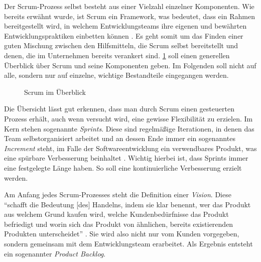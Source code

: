 Der Scrum-Prozess selbst besteht aus einer Vielzahl einzelner Komponenten. Wie bereits erwähnt wurde, ist Scrum ein Framework, was bedeutet, dass ein Rahmen bereitgestellt wird, in welchem Entwicklungsteams ihre eigenen und bewährten Entwicklungspraktiken einbetten können \cite[S. 27]{wirdemann_scrum_2017}. Es geht somit um das Finden einer guten Mischung zwischen den Hilfsmitteln, die Scrum selbst bereitstellt und denen, die im Unternehmen bereits verankert sind. \ref{fig:scrum} soll einen generellen Überblick über Scrum und seine Komponenten geben. Im Folgenden soll nicht auf alle, sondern nur auf einzelne, wichtige Bestandteile eingegangen werden.

\begin{figure}[H]
	\centering
	\caption[Scrum im Überblick]{Scrum im Überblick \protect \cite[S. 29]{wirdemann_scrum_2017}}
	\label{fig:scrum}
\end{figure}

Die Übersicht lässt gut erkennen, dass man durch Scrum  einen gesteuerten Prozess erhält, auch wenn versucht wird, eine gewisse  Flexibilität zu erzielen. Im Kern stehen sogenannte \textit{Sprints}. Diese sind regelmäßige Iterationen, in denen das Team selbstorganisiert arbeitet und an dessen Ende immer ein sogenanntes \textit{Increment} steht, im Falle der Softwareentwicklung ein verwendbares Produkt, was eine spürbare  Verbesserung beinhaltet \cite[S. 30]{wirdemann_scrum_2017}. Wichtig hierbei ist, dass Sprints immer eine festgelegte Länge haben. So soll eine kontinuierliche Verbesserung erzielt werden.

Am Anfang jedes  Scrum-Prozesses steht die Definition einer \textit{Vision}. Diese \\ ``schafft die Bedeutung [des] Handelns, indem sie klar benennt, wer das Produkt aus welchem Grund kaufen wird, welche Kundenbedürfnisse das Produkt befriedigt und worin sich das Produkt von ähnlichen, bereits existierenden Produkten unterscheidet'' \cite[S. 29]{wirdemann_scrum_2017}. Sie wird also nicht nur vom Kunden vorgegeben, sondern gemeinsam mit dem Entwicklungsteam erarbeitet. Als Ergebnis entsteht ein sogenannter \textit{Product Backlog}.

